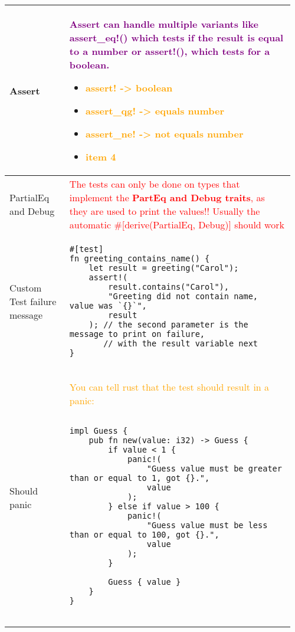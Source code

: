\documentclass[main.tex,fontsize=8pt,paper=a4,paper=portrait,DIV=calc,]{scrartcl}
\begin{document}
\begin{table}[ht!]
\begin{tabular}{|m{0.2\linewidth}|m{0.755\linewidth}|}
\hline
Assert & 
\textcolor{purple}{Assert can handle multiple variants like \textbf{assert\_eq!()} which tests if the result is equal to a number or \textbf{assert!()}, which tests for a boolean.}\newline
\begin{itemize}
\item \textcolor{orange}{assert! -> boolean}
\item \textcolor{orange}{assert\_qg! -> equals number}
\item \textcolor{orange}{assert\_ne! -> not equals number}
\item \textcolor{orange}{item 4}
\vspace{2mm}
\end{itemize}\\ 
\hline
PartialEq and Debug & 
\textcolor{red}{The tests can only be done on types that implement the \textbf{PartEq and Debug traits}, as they are used to print the values!!\newline
Usually the automatic \#[derive(PartialEq, Debug)] should work}\\
\hline
Custom Test failure message & 
\begin{lstlisting}
#[test]
fn greeting_contains_name() {
    let result = greeting("Carol");
    assert!(
        result.contains("Carol"),
        "Greeting did not contain name, value was `{}`",
        result
    ); // the second parameter is the message to print on failure,
       // with the result variable next
}
\end{lstlisting}\\
\hline
Should panic & 
\textcolor{orange}{You can tell rust that the test should result in a panic:}\newline
\begin{lstlisting}

impl Guess {
    pub fn new(value: i32) -> Guess {
        if value < 1 {
            panic!(
                "Guess value must be greater than or equal to 1, got {}.",
                value
            );
        } else if value > 100 {
            panic!(
                "Guess value must be less than or equal to 100, got {}.",
                value
            );
        }

        Guess { value }
    }
}


\end{lstlisting}
\end{tabular}
\end{table}
\end{document}
